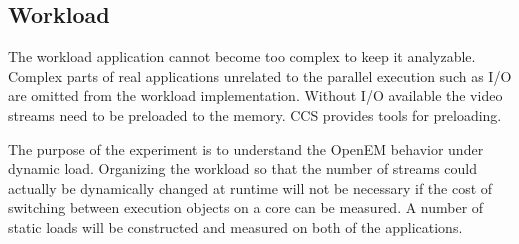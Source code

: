 \subsection{Workload}
The workload application cannot become too complex to keep it analyzable. Complex parts of real applications unrelated to the parallel execution such as I/O are omitted from the workload implementation. Without I/O available the video streams need to be preloaded to the memory. CCS provides tools for preloading.

The purpose of the experiment is to understand the OpenEM behavior under dynamic load. Organizing the workload so that the number of streams could actually be dynamically changed at runtime will not be necessary if the cost of switching between execution objects on a core can be measured. A number of static loads will be constructed and measured on both of the applications.